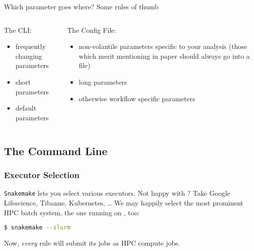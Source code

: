 \begin{frame}
  \pause
  \begin{exampleblock}{Which parameter goes where? Some rules of thumb}
    \begin{columns}[t]
      \begin{column}{0.5\textwidth}
        The CLI:
        \begin{itemize}
         \item frequently changing parameters
         \item short parameters
         \item default parameters
        \end{itemize}
      \end{column}
      \begin{column}{0.5\textwidth}
        The Config File:
        \begin{itemize}
         \item non-volantile parameters specific to your analysis (those which merit mentioning in paper should always go into a file)
         \item long parameters
         \item otherwise workflow specific parameters
        \end{itemize}
      \end{column}
    \end{columns}
  \end{exampleblock}
\end{frame}


\subsection{The Command Line}

\begin{frame}[fragile]
  \frametitle{Executor Selection}
  \texttt{Snakemake} lets you select various executors. Not happy with \mogon? Take Google Lifescience, Tibanne, Kubernetes, \ldots \newline
  We may happily select the most prominent HPC batch system, the one running on \mogon, too:
  \begin{lstlisting}[language=Bash, style=Shell]
$ snakemake --slurm
  \end{lstlisting}
  Now, \emph{every} rule will submit its jobs as HPC compute jobs.
\end{frame}

